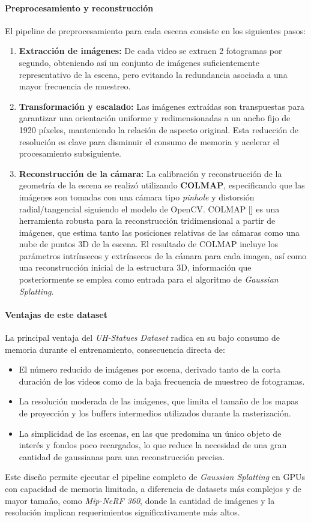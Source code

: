 \paragraph{Preprocesamiento y reconstrucción}
El pipeline de preprocesamiento para cada escena consiste en los siguientes pasos:
\begin{enumerate}
    \item \textbf{Extracción de imágenes:} De cada video se extraen 2 fotogramas por segundo, obteniendo así un conjunto de imágenes suficientemente representativo de la escena, pero evitando la redundancia asociada a una mayor frecuencia de muestreo.
    \item \textbf{Transformación y escalado:} Las imágenes extraídas son transpuestas para garantizar una orientación uniforme y redimensionadas a un ancho fijo de 1920 píxeles, manteniendo la relación de aspecto original. Esta reducción de resolución es clave para disminuir el consumo de memoria y acelerar el procesamiento subsiguiente.
    \item \textbf{Reconstrucción de la cámara:} La calibración y reconstrucción de la geometría de la escena se realizó utilizando \textbf{COLMAP}, especificando que las imágenes son tomadas con una cámara tipo \emph{pinhole} y distorsión radial/tangencial siguiendo el modelo de OpenCV. COLMAP [\cite{schonberger2016structure}] es una herramienta robusta para la reconstrucción tridimensional a partir de imágenes, que estima tanto las posiciones relativas de las cámaras como una nube de puntos 3D de la escena. El resultado de COLMAP incluye los parámetros intrínsecos y extrínsecos de la cámara para cada imagen, así como una reconstrucción inicial de la estructura 3D, información que posteriormente se emplea como entrada para el algoritmo de \emph{Gaussian Splatting}.
\end{enumerate}

\paragraph{Ventajas de este dataset}
La principal ventaja del \emph{UH-Statues Dataset} radica en su bajo consumo de memoria durante el entrenamiento, consecuencia directa de:
\begin{itemize}
    \item El número reducido de imágenes por escena, derivado tanto de la corta duración de los videos como de la baja frecuencia de muestreo de fotogramas.
    \item La resolución moderada de las imágenes, que limita el tamaño de los mapas de proyección y los buffers intermedios utilizados durante la rasterización.
    \item La simplicidad de las escenas, en las que predomina un único objeto de interés y fondos poco recargados, lo que reduce la necesidad de una gran cantidad de gaussianas para una reconstrucción precisa.
\end{itemize}
Este diseño permite ejecutar el pipeline completo de \emph{Gaussian Splatting} en GPUs con capacidad de memoria limitada, a diferencia de datasets más complejos y de mayor tamaño, como \emph{Mip-NeRF 360}, donde la cantidad de imágenes y la resolución implican requerimientos significativamente más altos.

